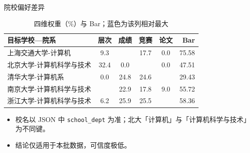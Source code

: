 \documentclass[10pt, aspectratio=169]{beamer}
\begin{document}
\begin{frame}{院校偏好差异}
    \begin{table}[]
        \centering
        \caption{四维权重（\%）与 Bar；蓝色为该列相对最大}
        \tiny
        \begin{tabular}{l|cccc|r}
        \toprule
        目标学校—院系 & 层次 & 成绩 & 竞赛 & 论文 & Bar \\ \midrule
        上海交通大学-计算机 & 9.3 & \color{blue}{73.0} & 17.7 & 0.0 & 75.58 \\
        北京大学-计算机科学与技术 & 32.4 & 0.0 & \color{blue}{67.6} & 0.0 & 47.51 \\
        清华大学-计算机系 & 0.0 & 24.8 & 24.6 & \color{blue}{50.6} & 29.43 \\
        南京大学-计算机科学与技术 & \color{blue}{50.3} & 22.9 & 17.8 & 9.0 & 55.72 \\
        浙江大学-计算机科学与技术 & 6.2 & 25.9 & 25.5 & \color{blue}{42.4} & 58.36 \\
        \bottomrule
        \end{tabular}
    \end{table}
    \begin{itemize}
        \scriptsize
        \item 校名以 JSON 中 \texttt{school\_dept} 为准；北大「计算机」与「计算机科学与技术」为不同键。
        \item 结论仅适用于本批数据，可信度极低。
    \end{itemize}
\end{frame}
\end{document}
